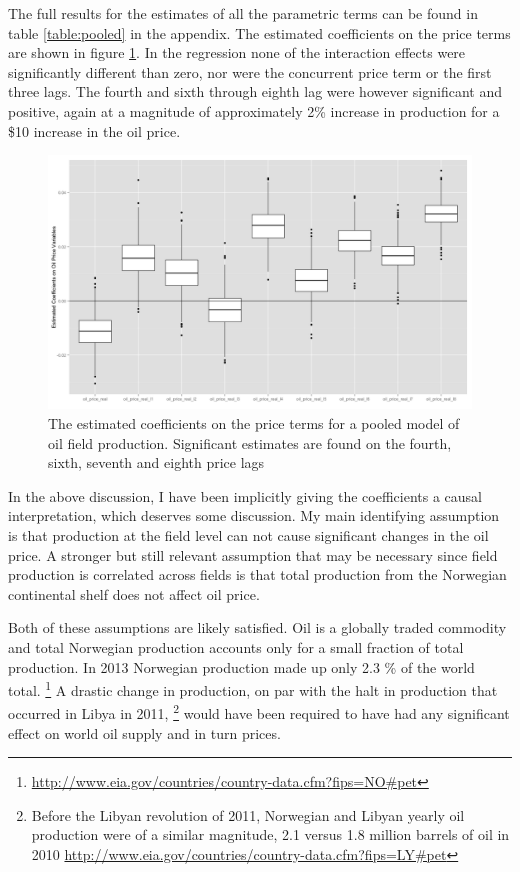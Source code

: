 \documentclass[12pt]{article}
\begin{document}
The full results for the estimates of all the parametric terms can be found in table \ref{table:pooled} in the appendix.  The estimated coefficients on the price terms are shown in figure \ref{gam_price_pooled}. In the regression none of the interaction effects were significantly different than zero, nor were the concurrent price term or the first three lags.  The fourth and sixth through eighth lag were however significant and positive, again at a magnitude of approximately 2\% increase in production for a \$10 increase in the oil price.

\begin{figure}
	\includegraphics[width=1\textwidth]{figures/gam_price_pooled_print.png}
	\caption{The estimated coefficients on the price terms for a pooled model of oil field production.  Significant estimates are found on the fourth, sixth, seventh and eighth price lags}
	\label{gam_price_pooled}
\end{figure}

In the above discussion, I have been implicitly giving the coefficients a causal interpretation, which deserves some discussion.  My main identifying assumption is that production at the field level can not cause significant changes in the oil price.  A stronger but still relevant assumption that may be necessary since field production is correlated across fields is that total production from the Norwegian continental shelf does not affect oil price.  

Both of these assumptions are likely satisfied.  Oil is a globally traded commodity and total Norwegian production accounts only for a small fraction of total production.  In 2013 Norwegian production made up only 2.3 \% of the world total. \footnote{\url{http://www.eia.gov/countries/country-data.cfm?fips=NO#pet}}  A drastic change in production, on par with the halt in production that occurred in Libya in 2011, \footnote{Before the Libyan revolution of 2011, Norwegian and Libyan yearly oil production were of a similar magnitude, 2.1 versus 1.8 million barrels of oil in 2010 \url{http://www.eia.gov/countries/country-data.cfm?fips=LY#pet}} would have been required to have had any significant effect on world oil supply and in turn prices. 
\end{document}
